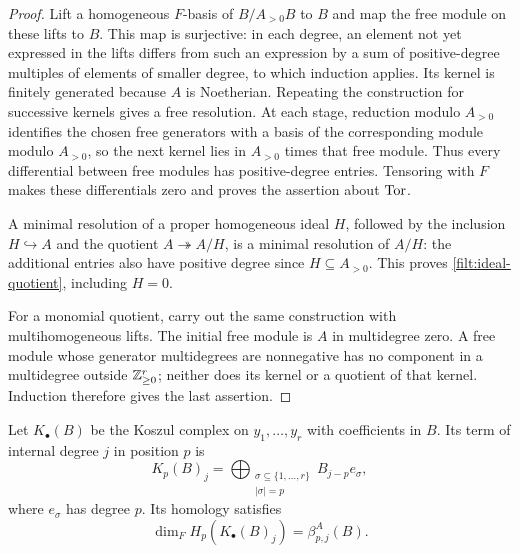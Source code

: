 \begin{proof}
Lift a homogeneous $F$-basis of $B/A_{>0}B$ to $B$ and map the free module
on these lifts to $B$.  This map is surjective: in each degree, an element
not yet expressed in the lifts differs from such an expression by a sum
of positive-degree multiples of elements of smaller degree, to which
induction applies.  Its kernel is finitely generated because $A$ is
Noetherian.  Repeating the construction for successive kernels gives a
free resolution.  At each stage, reduction modulo $A_{>0}$ identifies the
chosen free generators with a basis of the corresponding module modulo
$A_{>0}$, so the next kernel lies in $A_{>0}$ times that free module.
Thus every differential between free modules has positive-degree
entries.  Tensoring with $F$ makes these differentials zero and proves
the assertion about $\operatorname{Tor}$.

A minimal resolution of a proper homogeneous ideal $H$, followed by
the inclusion $H\hookrightarrow A$ and the quotient $A\twoheadrightarrow
A/H$, is a minimal resolution of $A/H$: the additional entries also
have positive degree since $H\subseteq A_{>0}$.  This proves
\eqref{filt:ideal-quotient}, including $H=0$.

For a monomial quotient, carry out the same construction with
multihomogeneous lifts.  The initial free module is $A$ in multidegree
zero.  A free module whose generator multidegrees are nonnegative has
no component in a multidegree outside $\mathbb Z_{\geq0}^r$; neither does its
kernel or a quotient of that kernel.  Induction therefore gives the
last assertion.
\end{proof}

\begin{lemma}
\label{filt:koszul}
Let $K_\bullet(B)$ be the Koszul complex on $y_1,\ldots,y_r$ with
coefficients in $B$.  Its term of internal degree $j$ in position $p$ is
\[
 K_p(B)_j=\bigoplus_{\substack{\sigma\subseteq\{1,\ldots,r\}\\
                              |\sigma|=p}} B_{j-p}e_\sigma,
\]
where $e_\sigma$ has degree $p$.  Its homology satisfies
\[
 \dim_F H_p(K_\bullet(B)_j)=\beta^A_{p,j}(B).
\]
\end{lemma}


